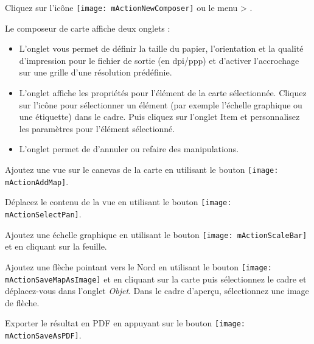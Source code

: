 Cliquez sur l'icône \texttt{[image: mActionNewComposer]} ou le menu  > .

Le composeur de carte affiche deux onglets :

\begin{itemize}[label=--]
\item L'onglet  vous permet de définir la taille du papier, l'orientation et la qualité d'impression pour le fichier de sortie (en dpi/ppp) et d'activer l'accrochage sur une grille d'une résolution prédéfinie.
\item L'onglet  affiche les propriétés pour l'élément de la carte sélectionnée. Cliquez sur l'icône   pour sélectionner un élément (par exemple l'échelle graphique ou une étiquette) dans le cadre. Puis cliquez sur l'onglet Item et personnalisez les paramètres pour l'élément sélectionné.
\item L'onglet  permet de d'annuler ou refaire des manipulations.
\end{itemize}

Ajoutez une vue sur le canevas de la carte en utilisant le bouton \texttt{[image: mActionAddMap]}.

Déplacez le contenu de la vue en utilisant le bouton \texttt{[image: mActionSelectPan]}.

Ajoutez une échelle graphique en utilisant le bouton \texttt{[image: mActionScaleBar]} et en cliquant sur la feuille.

Ajoutez une flèche pointant vers le Nord en utilisant le bouton \texttt{[image: mActionSaveMapAsImage]} et en cliquant sur la carte puis sélectionnez le cadre et déplacez-vous dans l'onglet \textit{Objet}. Dans le cadre d'aperçu, sélectionnez une image de flèche.

Exporter le résultat en PDF en appuyant sur le bouton \texttt{[image: mActionSaveAsPDF]}.